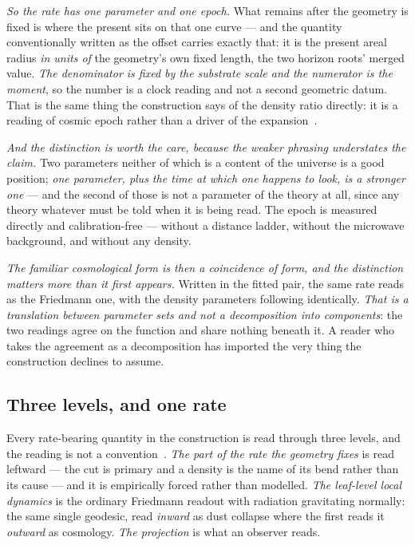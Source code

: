 \documentclass[11pt,a4paper]{article}
\theoremstyle{plain}
\theoremstyle{definition}
\begin{document}
\emph{So the rate has one parameter and one epoch.} What remains after the geometry is fixed is where the
present sits on that one curve --- and the quantity conventionally written as the offset carries exactly
that: it is the present areal radius \emph{in units of} the geometry's own fixed length, the two horizon
roots' merged value. \emph{The denominator is fixed by the substrate scale and the numerator is the moment},
so the number is a clock reading and not a second geometric datum. That is the same thing the construction
says of the density ratio directly: it is a reading of cosmic epoch rather than a driver of the
expansion~\cite{JanzenCRcosmology}.

\emph{And the distinction is worth the care, because the weaker phrasing understates the claim.} Two
parameters neither of which is a content of the universe is a good position; \emph{one parameter, plus the
time at which one happens to look, is a stronger one} --- and the second of those is not a parameter of the
theory at all, since any theory whatever must be told when it is being read. The epoch is measured directly
and calibration-free --- without a distance ladder, without the microwave background, and without any
density.

\emph{The familiar cosmological form is then a coincidence of form, and the distinction matters more than it
first appears.} Written in the fitted pair, the same rate reads as the Friedmann one, with the density
parameters following identically. \emph{That is a translation between parameter sets and not a decomposition
into components}: the two readings agree on the function and share nothing beneath it. A reader who takes
the agreement as a decomposition has imported the very thing the construction declines to assume.

\subsection{Three levels, and one rate}

Every rate-bearing quantity in the construction is read through three levels, and the reading is not a
convention~\cite{JanzenCRcosmology}. \emph{The part of the rate the geometry fixes} is read leftward --- the cut is
primary and a density is the name of its bend rather than its cause --- and it is empirically forced rather
than modelled. \emph{The leaf-level local dynamics} is the ordinary Friedmann readout with radiation
gravitating normally: the same single geodesic, read \emph{inward} as dust collapse where the first reads it
\emph{outward} as cosmology. \emph{The projection} is what an observer reads.
\end{document}
